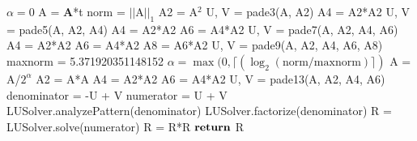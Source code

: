 \begin{algorithm}
	\caption{Pad\'e Method 1} 
	\begin{algorithmic}[1]
		\State $\alpha = 0$ 
		\State A = $\boldsymbol{A}$*t 
		\State norm = $||\text{A}||_{1}$ 
		\State A2 = A$^{2}$ 
        \State U, V = pade3(A, A2) 
        \State A4 = A2*A2
        \State  U, V = pade5(A, A2, A4) 
        \State A4 = A2*A2
        \State A6 = A4*A2
        \State U, V = pade7(A, A2, A4, A6) 
        \State A4 = A2*A2
        \State A6 = A4*A2
        \State A8 = A6*A2
        \State U, V = pade9(A, A2, A4, A6, A8) 
        \Else 
        \State maxnorm = 5.371920351148152
        \State $\alpha = \max(0, \lceil(\log_{2}(\text{norm}/\text{maxnorm})\rceil)$ 
        \State A = A/$2^{\alpha}$ 
        \State A2 = A*A
        \State A4 = A2*A2
        \State A6 = A4*A2
        \State U, V = pade13(A, A2, A4, A6) 
        \EndIf
        \State denominator = -U + V 
        \State numerator = U + V 
        \State LUSolver.analyzePattern(denominator) 
        \State LUSolver.factorize(denominator) 
        \State R = LUSolver.solve(numerator) 
         
            \State R = R*R
        \EndFor
        \State ${\text{\textbf{return}}}$ R
		\EndProcedure
	\end{algorithmic} 
	\label{alg:method1}
\end{algorithm}


